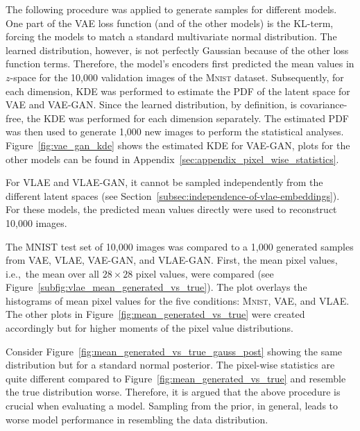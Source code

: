 The following procedure was applied to generate samples for different models.
One part of the \ac{VAE} loss function (and of the other models) is the \ac{KL}-term, forcing the models to match a standard multivariate normal distribution.
The learned distribution, however, is not perfectly Gaussian because of the other loss function terms.
Therefore, the model's encoders first predicted the mean values in $z$-space for the 10,000 validation images of the \textsc{Mnist} dataset.
Subsequently, for each dimension, \ac{KDE} was performed to estimate the \ac{PDF} of the latent space for \ac{VAE} and \ac{VAE}-\ac{GAN}.
Since the learned distribution, by definition, is covariance-free, the \ac{KDE} was performed for each dimension separately.
The estimated \ac{PDF} was then used to generate 1,000 new images to perform the statistical analyses.
Figure~\ref{fig:vae_gan_kde} shows the estimated \ac{KDE} for \ac{VAE}-\ac{GAN}, plots for the other models can be found in Appendix~\ref{sec:appendix_pixel_wise_statistics}.

For \ac{VLAE} and \ac{VLAE}-\ac{GAN}, it cannot be sampled independently from the different latent spaces (see Section~\ref{subsec:independence-of-vlae-embeddings}).
For these models, the predicted mean values directly were used to reconstruct 10,000 images.

The MNIST test set of 10,000 images was compared to a 1,000 generated samples from \ac{VAE}, \ac{VLAE}, \ac{VAE}-\ac{GAN}, and \ac{VLAE}-\ac{GAN}.
First, the mean pixel values, i.e.,~the mean over all $28\times 28$ pixel values, were compared (see Figure~\ref{subfig:vlae_mean_generated_vs_true}).
The plot overlays the histograms of mean pixel values for the five conditions: \textsc{Mnist}, \ac{VAE}, and \ac{VLAE}.
The other plots in Figure~\ref{fig:mean_generated_vs_true} were created accordingly but for higher moments of the pixel value distributions.

Consider Figure~\ref{fig:mean_generated_vs_true_gauss_post} showing the same distribution but for a standard normal posterior.
The pixel-wise statistics are quite different compared to Figure~\ref{fig:mean_generated_vs_true} and resemble the true distribution worse.
Therefore, it is argued that the above procedure is crucial when evaluating a model.
Sampling from the prior, in general, leads to worse model performance in resembling the data distribution.

